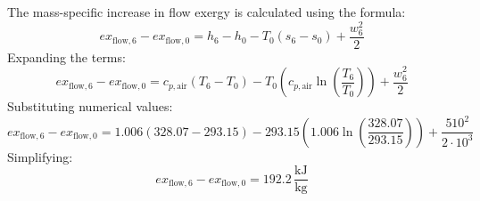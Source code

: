The mass-specific increase in flow exergy is calculated using the formula:  
\[
ex_{\text{flow},6} - ex_{\text{flow},0} = h_6 - h_0 - T_0 (s_6 - s_0) + \frac{w_6^2}{2}
\]  
Expanding the terms:  
\[
ex_{\text{flow},6} - ex_{\text{flow},0} = c_{p,\text{air}} (T_6 - T_0) - T_0 \left( c_{p,\text{air}} \ln \left( \frac{T_6}{T_0} \right) \right) + \frac{w_6^2}{2}
\]  
Substituting numerical values:  
\[
ex_{\text{flow},6} - ex_{\text{flow},0} = 1.006 (328.07 - 293.15) - 293.15 \left( 1.006 \ln \left( \frac{328.07}{293.15} \right) \right) + \frac{510^2}{2 \cdot 10^3}
\]  
Simplifying:  
\[
ex_{\text{flow},6} - ex_{\text{flow},0} = 192.2 \, \frac{\text{kJ}}{\text{kg}}
\]